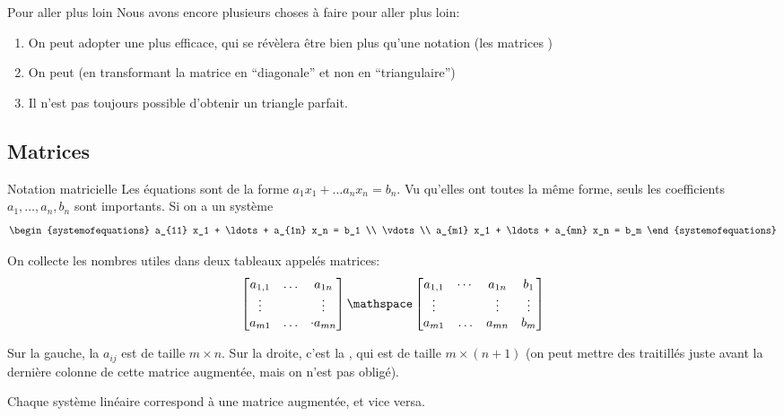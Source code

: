 \documentclass{article}
\begin{document}
\begin{parag}{Pour aller plus loin}
    Nous avons encore plusieurs choses à faire pour aller plus loin:
    \begin{enumerate}
        \item On peut adopter une  plus efficace, qui se révèlera être bien plus qu'une notation (les matrices \smiley)
        \item On peut  (en transformant la matrice en ``diagonale'' et non en ``triangulaire'')
        \item Il n'est pas toujours possible d'obtenir un triangle parfait.
    \end{enumerate}
\end{parag}

\subsection{Matrices}
\begin{parag}{Notation matricielle}
    Les équations sont de la forme $a_1 x_1 + \ldots a_n x_n = b_n$. Vu qu'elles ont toutes la même forme, seuls les coefficients $a_1, \ldots, a_n, b_n$ sont importants. Si on a un système
    \[\begin{systemofequations}
    a_{11} x_1 + \ldots + a_{1n} x_n = b_1 \\
    \vdots \\
    a_{m1} x_1 + \ldots + a_{mn} x_n = b_m
    \end{systemofequations}\]

    On collecte les nombres utiles dans deux tableaux appelés matrices:
\[\begin{bmatrix} a_{1,1} & \ldots & a_{1n} \\ \vdots &  & \vdots \\ a_{m1} & \ldots & \cdot a_{mn} \end{bmatrix} \mathspace \begin{bmatrix} a_{1,1} & \cdots & a_{1n} & b_1 \\ \vdots &   & \vdots & \vdots \\ a_{m1} & \ldots & a_{mn} & b_m \end{bmatrix}\]

    Sur la gauche, la  $a_{ij}$ est de taille $m \times n$. Sur la droite, c'est la , qui est de taille $m \times \left(n + 1\right)$ (on peut mettre des traitillés juste avant la dernière colonne de cette matrice augmentée, mais on n'est pas obligé).

    Chaque système linéaire correspond à une matrice augmentée, et vice versa.
\end{parag}
\end{document}
